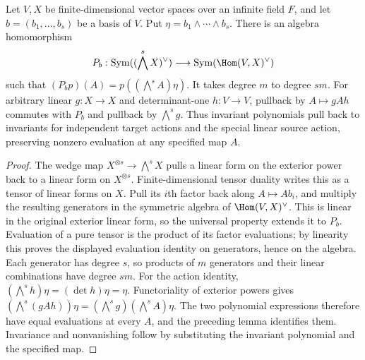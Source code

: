 \begin{lemma}
\label{lem:plucker-polynomial-pullback}
\leanok
Let $V,X$ be finite-dimensional vector spaces over an infinite field $F$,
and let $b=(b_1,\ldots,b_s)$ be a basis of $V$. Put
$\eta=b_1\wedge\cdots\wedge b_s$.
There is an algebra homomorphism
\[
 P_b:\operatorname{Sym}((\bigwedge^s X)^\vee)
 \longrightarrow\operatorname{Sym}(\Hom(V,X)^\vee)
\]
such that $(P_b p)(A)=p((\bigwedge^s A)\eta)$. It takes degree $m$
to degree $sm$. For arbitrary linear $g:X\to X$ and determinant-one
$h:V\to V$, pullback by $A\mapsto gAh$ commutes with $P_b$ and pullback by
$\bigwedge^s g$. Thus invariant polynomials pull back to invariants for
independent target actions and the special linear source action, preserving
nonzero evaluation at any specified map $A$.
\end{lemma}
\begin{proof}
The wedge map $X^{\otimes s}\to\bigwedge^s X$ pulls a linear form on
the exterior power back to a linear form on $X^{\otimes s}$.
Finite-dimensional tensor duality writes this as a tensor of linear forms
on $X$. Pull its $i$th factor back along $A\mapsto A b_i$, and multiply
the resulting generators in the symmetric algebra of $\Hom(V,X)^\vee$.
This is linear in the original exterior linear form, so the universal
property extends it to $P_b$. Evaluation of a pure tensor is the product
of its factor evaluations; by linearity this proves the displayed
evaluation identity on generators, hence on the algebra. Each generator
has degree $s$, so products of $m$ generators and their linear combinations
have degree $sm$.
For the action identity, $(\bigwedge^s h)\eta=(\det h)\eta=\eta$.
Functoriality of exterior powers gives
$(\bigwedge^s(gAh))\eta=(\bigwedge^s g)(\bigwedge^s A)\eta$.
The two polynomial expressions therefore have equal evaluations at every
$A$, and the preceding lemma identifies them. Invariance and nonvanishing
follow by substituting the invariant polynomial and the specified map.
\end{proof}

